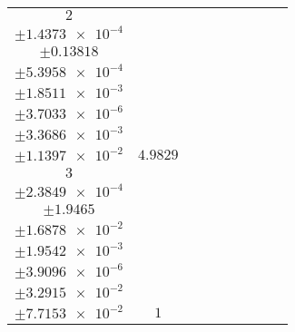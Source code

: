 \documentclass[8pt]{article}
\begin{document}
\begin{longtable}[l]{c c c c c c c c c}
$\num{2}$ & \begin{tabular}[c]{@{}c@{}}$\num{5.9836e-2}$ \\ $\pm\num{1.4373e-4}$\end{tabular} & \begin{tabular}[c]{@{}c@{}}$\num{-0.97957}$ \\ $\pm\num{0.13818}$\end{tabular} & \begin{tabular}[c]{@{}c@{}}$\num{-6.9962}$ \\ $\pm\num{5.3958e-4}$\end{tabular} & \begin{tabular}[c]{@{}c@{}}$\num{1.5588e+3}$ \\ $\pm\num{1.8511e-3}$\end{tabular} & \begin{tabular}[c]{@{}c@{}}$\num{3.1185}$ \\ $\pm\num{3.7033e-6}$\end{tabular} & \begin{tabular}[c]{@{}c@{}}$\num{1.1654}$ \\ $\pm\num{3.3686e-3}$\end{tabular} & \begin{tabular}[c]{@{}c@{}}$\num{4.1695}$ \\ $\pm\num{1.1397e-2}$\end{tabular} & $\num{4.9829}$\\
$\num{3}$ & \begin{tabular}[c]{@{}c@{}}$\num{1.3494e-2}$ \\ $\pm\num{2.3849e-4}$\end{tabular} & \begin{tabular}[c]{@{}c@{}}$\num{-0.31057}$ \\ $\pm\num{1.9465}$\end{tabular} & \begin{tabular}[c]{@{}c@{}}$\num{-5.5205}$ \\ $\pm\num{1.6878e-2}$\end{tabular} & \begin{tabular}[c]{@{}c@{}}$\num{1.569e+3}$ \\ $\pm\num{1.9542e-3}$\end{tabular} & \begin{tabular}[c]{@{}c@{}}$\num{3.1389}$ \\ $\pm\num{3.9096e-6}$\end{tabular} & \begin{tabular}[c]{@{}c@{}}$\num{2.4112}$ \\ $\pm\num{3.2915e-2}$\end{tabular} & \begin{tabular}[c]{@{}c@{}}$\num{4.4277}$ \\ $\pm\num{7.7153e-2}$\end{tabular} & $\num{1}$\\

\end{longtable}
\end{document}
